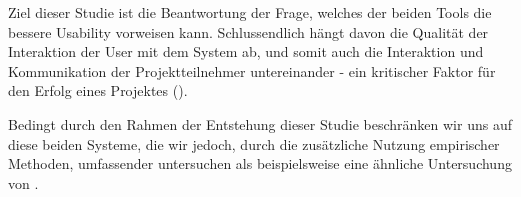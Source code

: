 Ziel dieser Studie ist die Beantwortung der Frage, welches der beiden Tools die bessere Usability vorweisen kann. Schlussendlich hängt davon die Qualität der Interaktion der User mit dem System ab, und somit auch die Interaktion und Kommunikation der Projektteilnehmer untereinander - ein kritischer Faktor für den Erfolg eines Projektes (\cite{cervone2014effective}).

Bedingt durch den Rahmen der Entstehung dieser Studie beschränken wir uns auf diese beiden Systeme, die wir jedoch, durch die zusätzliche Nutzung empirischer Methoden, umfassender untersuchen als beispielsweise eine ähnliche Untersuchung von \cite{cicibas2010comparison}.